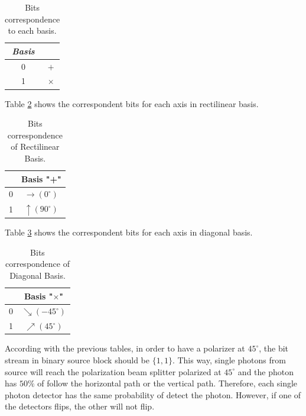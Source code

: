 \begin{table}[H]
    \caption{Bits correspondence to each basis.}
     \label{tb:basisbits}
    \centering
    \begin{tabular}{c|c}
    \textbf{\textit{Basis}}         &  \\ \hline
     0 & $+$ \\
     1 & $\times$ \\
    \end{tabular}

\end{table}
Table \ref{tb:rectilinear} shows the correspondent bits for each axis in rectilinear basis.

\begin{table}[H]
    \caption{Bits correspondence of Rectilinear Basis.}
    \label{tb:rectilinear}
    \centering
    \begin{tabular}{c|c}
                & Basis "+" \\ \hline
     0 & $\to (0^{\circ})$ \\
     1 & $\uparrow (90^{\circ})$ \\
    \end{tabular}

\end{table}

Table \ref{tb:diagonal} shows the correspondent bits for each axis in diagonal basis.

\begin{table}[H]
    \caption{Bits correspondence of Diagonal Basis.}
    \label{tb:diagonal}
    \centering
    \begin{tabular}{c|c}
          & Basis "$\times$" \\ \hline
     0 & $\searrow (-45^{\circ})$ \\
     1 & $\nearrow (45^{\circ})$ \\
    \end{tabular}

\end{table}

According with the previous tables, in order to have a polarizer at $45^\circ$, the bit stream in binary source block should be $\{1,1\}$. This way, single photons from source will reach the polarization beam splitter polarized at $45^\circ$ and the photon has $50\%$ of follow the horizontal path or the vertical path. Therefore, each single photon detector has the same probability of detect the photon. However, if one of the detectors flips, the other will not flip.

